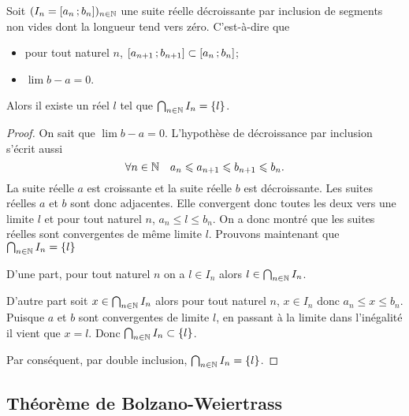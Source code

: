 \begin{theo}
  Soit \((I_n=\left[ a_n \, ;  b_n \right])_{n \in \mathbb{N}}\) une suite réelle décroissante par inclusion de segments non vides dont la longueur tend vers zéro. C'est-à-dire que
  \begin{itemize}
  \item pour tout naturel \(n\), \(\left[ a_{n+1} \, ;  b_{n+1} \right] \subset \left[ a_{n} \, ;  b_{n} \right]\);
  \item \(\lim b-a =0\).
  \end{itemize}
Alors il existe un réel \(l\) tel que \(\bigcap_{n \in \mathbb{N}} I_n = \{l\}\).
\end{theo}
\begin{proof}
  On sait que \(\lim b-a = 0\). L'hypothèse de décroissance par inclusion s'écrit aussi
  \begin{equation}
    \forall n \in \mathbb{N} \quad a_n \leqslant a_{n+1} \leqslant b_{n+1} \leqslant b_n.
  \end{equation}
La suite réelle \(a\) est croissante et la suite réelle \(b\) est décroissante. Les suites réelles \(a\) et \(b\) sont donc adjacentes. Elle convergent donc toutes les deux vers une limite \(l\) et pour tout naturel \(n\), \(a_n \leqslant l \leqslant b_n\). On a donc montré que les suites réelles sont convergentes de même limite \(l\). Prouvons maintenant que \(\bigcap_{n \in \mathbb{N}} I_n = \{l\}\)

D'une part, pour tout naturel \(n\) on a \(l \in I_n\) alors \(l \in \bigcap_{n \in \mathbb{N}} I_n\).

D'autre part soit \(x \in \bigcap_{n \in \mathbb{N}} I_n\) alors pour tout naturel \(n\), \(x \in I_n\) donc \(a_n \leqslant x \leqslant b_n\). Puisque \(a\) et \(b\) sont convergentes de limite \(l\), en passant à la limite dans l'inégalité il vient que \(x=l\). Donc \(\bigcap_{n \in \mathbb{N}} I_n \subset \{l\}\).

Par conséquent, par double inclusion, \(\bigcap_{n \in \mathbb{N}} I_n = \{l\}\).
\end{proof}

\subsection{Théorème de Bolzano-Weiertrass}

